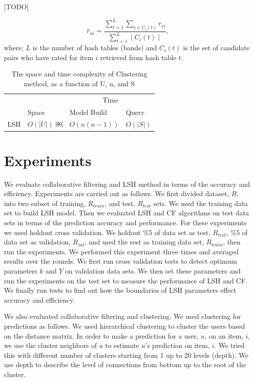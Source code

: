 \documentclass[conference]{IEEEtran}
\begin{document}
[TODO]

\begin{equation}
\hat{r}_{ui} = \frac{\sum\limits_{t=1}^{L} \sum\limits_{v \in C_i(t)} r_{vi}}{\sum\limits_{t=1}^{L} \mid C_i(t) \mid} ,
\label{eq:lsh-prediction}
\end{equation}
where; $L$ is the number of hash tables (bands) and  $C_i(t)$ is the set of 
candidate pairs who have rated for item $i$ retrieved from hash table $t$.

\begin{table}
\centering
\begin{tabular}{llll}
\hline
& & \multicolumn {2}{c}{Time} \\
\cline{3-4}
     & Space & Model Build  & Query \\
\hline
LSH & $O(|U|)$ ￼& $O(n(n-1))$ &$O(|S|)$ \\
\hline
\end{tabular}
\caption{The space and time complexity of Clustering  method, as a function of U, n, and S}
\label{table:complexity-lsh}
\end{table}

\section{Experiments}
\label{sec:experiements}

We evaluate collaborative filtering and LSH method in terms of the accuracy 
and efficiency. Experiments are carried out as follows. We first divided 
dataset, $R$, into two subset of training, $R_{train}$, and test, $R_{test}$ 
sets. We used the training data set to build LSH model. Then we evaluated LSH 
and CF algorithms on test data sets in terms of the prediction accuracy and
performance. For these experiments we used holdout cross validation. We holdout
\%5 of data set as test, $R_{test}$, \%5 of data set as validation, $R_{val}$, 
and used the rest as training data set, $R_{train}$, then run the experiments. 
We performed this experiment three times and averaged results over the rounds. 
We first run cross validation tests to detect optimum parameters $k$ and $Y$ on 
validation data sets. We then set these parameters and run the experiments on 
the test set to measure the performance of LSH and CF. We finally run tests to 
find out how the boundaries of LSH parameters effect accuracy and efficiency. 

We also evaluated collaborative filtering and clustering. We used clustering for 
predictions as follows. We used hierarchical clustering to cluster the users 
based on the distance matrix. In order to make a prediction for a user, $u$, on
an item, $i$, we use the cluster neighbors of $u$ to estimate $u$'s prediction 
on item, $i$. We tried this with different number of clusters starting from 1 
up to 20 levels (depth). We use depth to describe the level of connections from
bottom up to the root of the cluster.
\end{document}
